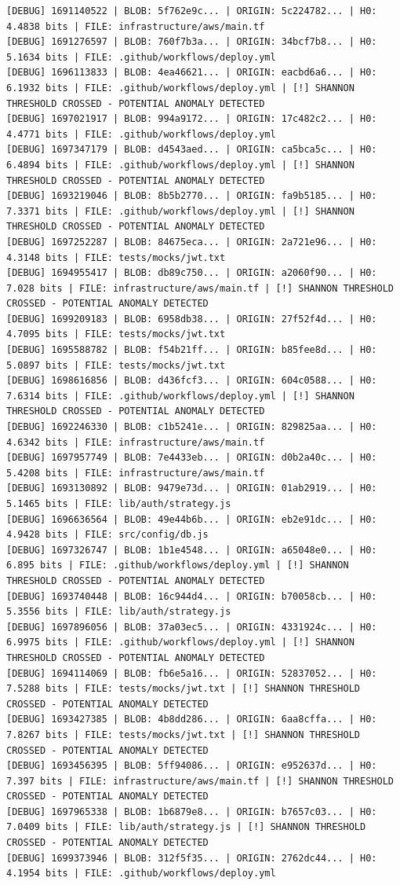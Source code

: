 \documentclass[12pt, a4paper, oneside]{report}
\begin{document}
\begin{lstlisting}[basicstyle=\tiny\ttfamily]
[DEBUG] 1691140522 | BLOB: 5f762e9c... | ORIGIN: 5c224782... | H0: 4.4838 bits | FILE: infrastructure/aws/main.tf
[DEBUG] 1691276597 | BLOB: 760f7b3a... | ORIGIN: 34bcf7b8... | H0: 5.1634 bits | FILE: .github/workflows/deploy.yml
[DEBUG] 1696113833 | BLOB: 4ea46621... | ORIGIN: eacbd6a6... | H0: 6.1932 bits | FILE: .github/workflows/deploy.yml | [!] SHANNON THRESHOLD CROSSED - POTENTIAL ANOMALY DETECTED
[DEBUG] 1697021917 | BLOB: 994a9172... | ORIGIN: 17c482c2... | H0: 4.4771 bits | FILE: .github/workflows/deploy.yml
[DEBUG] 1697347179 | BLOB: d4543aed... | ORIGIN: ca5bca5c... | H0: 6.4894 bits | FILE: .github/workflows/deploy.yml | [!] SHANNON THRESHOLD CROSSED - POTENTIAL ANOMALY DETECTED
[DEBUG] 1693219046 | BLOB: 8b5b2770... | ORIGIN: fa9b5185... | H0: 7.3371 bits | FILE: .github/workflows/deploy.yml | [!] SHANNON THRESHOLD CROSSED - POTENTIAL ANOMALY DETECTED
[DEBUG] 1697252287 | BLOB: 84675eca... | ORIGIN: 2a721e96... | H0: 4.3148 bits | FILE: tests/mocks/jwt.txt
[DEBUG] 1694955417 | BLOB: db89c750... | ORIGIN: a2060f90... | H0: 7.028 bits | FILE: infrastructure/aws/main.tf | [!] SHANNON THRESHOLD CROSSED - POTENTIAL ANOMALY DETECTED
[DEBUG] 1699209183 | BLOB: 6958db38... | ORIGIN: 27f52f4d... | H0: 4.7095 bits | FILE: tests/mocks/jwt.txt
[DEBUG] 1695588782 | BLOB: f54b21ff... | ORIGIN: b85fee8d... | H0: 5.0897 bits | FILE: tests/mocks/jwt.txt
[DEBUG] 1698616856 | BLOB: d436fcf3... | ORIGIN: 604c0588... | H0: 7.6314 bits | FILE: .github/workflows/deploy.yml | [!] SHANNON THRESHOLD CROSSED - POTENTIAL ANOMALY DETECTED
[DEBUG] 1692246330 | BLOB: c1b5241e... | ORIGIN: 829825aa... | H0: 4.6342 bits | FILE: infrastructure/aws/main.tf
[DEBUG] 1697957749 | BLOB: 7e4433eb... | ORIGIN: d0b2a40c... | H0: 5.4208 bits | FILE: infrastructure/aws/main.tf
[DEBUG] 1693130892 | BLOB: 9479e73d... | ORIGIN: 01ab2919... | H0: 5.1465 bits | FILE: lib/auth/strategy.js
[DEBUG] 1696636564 | BLOB: 49e44b6b... | ORIGIN: eb2e91dc... | H0: 4.9428 bits | FILE: src/config/db.js
[DEBUG] 1697326747 | BLOB: 1b1e4548... | ORIGIN: a65048e0... | H0: 6.895 bits | FILE: .github/workflows/deploy.yml | [!] SHANNON THRESHOLD CROSSED - POTENTIAL ANOMALY DETECTED
[DEBUG] 1693740448 | BLOB: 16c944d4... | ORIGIN: b70058cb... | H0: 5.3556 bits | FILE: lib/auth/strategy.js
[DEBUG] 1697896056 | BLOB: 37a03ec5... | ORIGIN: 4331924c... | H0: 6.9975 bits | FILE: .github/workflows/deploy.yml | [!] SHANNON THRESHOLD CROSSED - POTENTIAL ANOMALY DETECTED
[DEBUG] 1694114069 | BLOB: fb6e5a16... | ORIGIN: 52837052... | H0: 7.5288 bits | FILE: tests/mocks/jwt.txt | [!] SHANNON THRESHOLD CROSSED - POTENTIAL ANOMALY DETECTED
[DEBUG] 1693427385 | BLOB: 4b8dd286... | ORIGIN: 6aa8cffa... | H0: 7.8267 bits | FILE: tests/mocks/jwt.txt | [!] SHANNON THRESHOLD CROSSED - POTENTIAL ANOMALY DETECTED
[DEBUG] 1693456395 | BLOB: 5ff94086... | ORIGIN: e952637d... | H0: 7.397 bits | FILE: infrastructure/aws/main.tf | [!] SHANNON THRESHOLD CROSSED - POTENTIAL ANOMALY DETECTED
[DEBUG] 1697965338 | BLOB: 1b6879e8... | ORIGIN: b7657c03... | H0: 7.0409 bits | FILE: lib/auth/strategy.js | [!] SHANNON THRESHOLD CROSSED - POTENTIAL ANOMALY DETECTED
[DEBUG] 1699373946 | BLOB: 312f5f35... | ORIGIN: 2762dc44... | H0: 4.1954 bits | FILE: .github/workflows/deploy.yml
\end{lstlisting}
\end{document}
